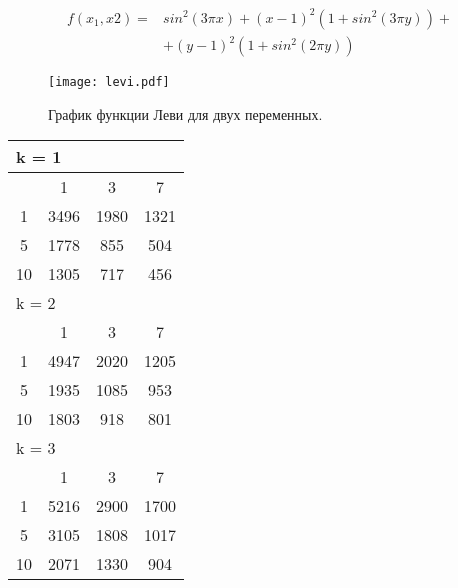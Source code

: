 \begin{equation}
\label{levi_eq}
\begin{split}
f(x_1, x2) = &sin^2(3\pi x) + (x - 1)^2(1 + sin^2(3\pi y)) + \\
& + (y - 1)^2(1 + sin^2(2\pi y))
\end{split}
\end{equation}

\begin{figure}
    \centering
    \texttt{[image: levi.pdf]}
    \caption{График функции Леви для двух переменных.}
    \label{levi_plot}
\end{figure}

\begin{table}
 \begin{tabular}{|*4{c|}}
\hline
\multicolumn{4}{|l|}{k = 1} \\
\hline
\multirow{1}{*}{\diagbox{$\mu$}{$\lambda$}} & \multicolumn{1}{c|}{1} & \multicolumn{1}{c|}{3} & \multicolumn{1}{c|}{7} \\
\hline
1 & 3496 & 1980 & 1321 \\
\hline
5 & 1778 & 855 & 504 \\
\hline
10 & 1305 & 717 & 456 \\
\hline
\multicolumn{4}{|l|}{k = 2} \\
\hline
\multirow{1}{*}{\diagbox{$\mu$}{$\lambda$}} & \multicolumn{1}{c|}{1} & \multicolumn{1}{c|}{3} & \multicolumn{1}{c|}{7} \\
\hline
1 & 4947 & 2020 & 1205 \\
\hline
5 & 1935 & 1085 & 953 \\
\hline
10 & 1803 & 918 & 801 \\
\hline
\multicolumn{4}{|l|}{k = 3} \\
\hline
\multirow{1}{*}{\diagbox{$\mu$}{$\lambda$}} & \multicolumn{1}{c|}{1} & \multicolumn{1}{c|}{3} & \multicolumn{1}{c|}{7} \\
\hline
1 & 5216 & 2900 & 1700 \\
\hline
5 & 3105 & 1808 & 1017 \\
\hline
10 & 2071 & 1330 & 904 \\
\hline
\end{tabular}
\end{table}


